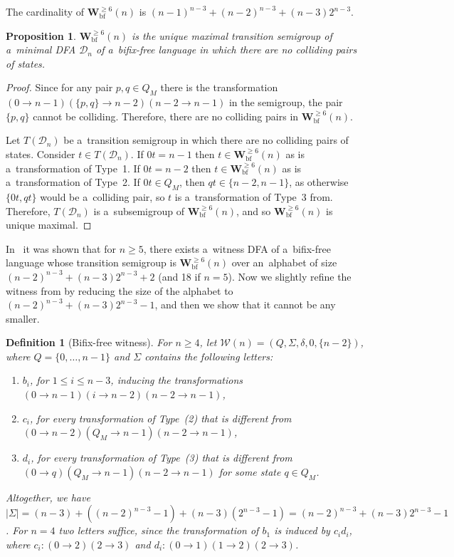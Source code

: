 \documentclass{amsart}
\newtheorem{proposition}[theorem]{Proposition}
\newtheorem{definition}[theorem]{Definition}
\renewcommand{\le}{\leqslant}
\renewcommand{\ge}{\geqslant}
\newcommand{\Wbf}{\mathbf{W}^{\ge 6}_{\mathrm{bf}}}
\newcommand{\cD}{{\mathcal D}}
\newcommand{\cW}{{\mathcal W}}
\begin{document}
The cardinality of $\Wbf(n)$ is $(n-1)^{n-3}+(n-2)^{n-3}+(n-3)2^{n-3}$.

\begin{proposition}\label{pro:Wbf_unique}
$\Wbf(n)$ is the unique maximal transition semigroup of a~minimal DFA $\cD_n$ of a~bifix-free language in which there are no colliding pairs of states.
\end{proposition}
\begin{proof}
Since for any pair $p,q \in Q_M$ there is the transformation $(0 \to n-1)(\{p,q\} \to n-2)(n-2 \to n-1)$ in the semigroup, the pair $\{p,q\}$ cannot be colliding.
Therefore, there are no colliding pairs in $\Wbf(n)$.

Let $T(\cD_n)$ be a~transition semigroup in which there are no colliding pairs of states.
Consider $t \in T(\cD_n)$.
If $0t = n-1$ then $t \in \Wbf(n)$ as is a~transformation of Type~1.
If $0t = n-2$ then $t \in \Wbf(n)$ as is a~transformation of Type~2.
If $0t \in Q_M$, then $qt \in \{n-2,n-1\}$, as otherwise $\{0t,qt\}$ would be a~colliding pair, so $t$ is a~transformation of Type~3 from.
Therefore, $T(\cD_n)$ is a~subsemigroup of $\Wbf(n)$, and so $\Wbf(n)$ is unique maximal.
\end{proof}

In~\cite{BLY12} it was shown that for $n \ge 5$, there exists a~witness DFA of a~bifix-free language whose transition semigroup is $\Wbf(n)$ over an~alphabet of size $(n-2)^{n-3}+(n-3)2^{n-3}+2$ (and 18 if $n=5$).
Now we slightly refine the witness from \cite[Proposition~31]{BLY12} by reducing the size of the alphabet to $(n-2)^{n-3} + (n-3)2^{n-3} - 1$, and then we show that it cannot be any smaller.
\begin{definition}[Bifix-free witness]
For $n \ge 4$, let $\cW(n) = (Q,\Sigma,\delta,0,\{n-2\})$, where $Q = \{0,\ldots,n-1\}$ and $\Sigma$ contains the following letters:
\begin{enumerate}
\item $b_i$, for $1 \le i \le n-3$, inducing the transformations $(0 \to n-1)(i \to n-2)(n-2 \to n-1)$,
\item $c_i$, for every transformation of Type~(2) that is different from $(0 \to n-2)(Q_M \to n-1)(n-2 \to n-1)$,
\item $d_i$, for every transformation of Type~(3) that is different from $(0 \to q)(Q_M \to n-1)(n-2 \to n-1)$ for some state $q \in Q_M$.
\end{enumerate}
Altogether, we have $|\Sigma| = (n-3) + ((n-2)^{n-3}-1) + (n-3)(2^{n-3}-1) = (n-2)^{n-3} + (n-3)2^{n-3} - 1$.
For $n=4$ two letters suffice, since the transformation of $b_1$ is induced by $c_i d_i$, where $c_i\colon (0 \to 2)(2 \to 3)$ and $d_i\colon (0 \to 1)(1 \to 2)(2 \to 3)$.
\end{definition}
\end{document}
